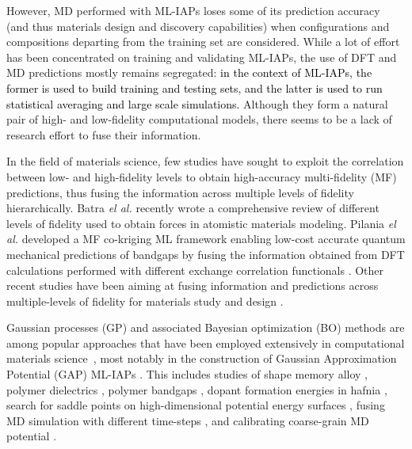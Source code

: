 \documentclass[%
 reprint,
aip,jcp
]{revtex4-1}
\newcommand{\review}[1]{\textcolor{black}{#1}}
\begin{document}

However, MD performed with ML-IAPs loses some of its prediction 
accuracy (and thus  materials design and discovery capabilities) 
when configurations and compositions departing from the training set 
are considered.
While a lot of effort has been concentrated on training and 
validating ML-IAPs, 
the use of DFT and MD predictions mostly remains segregated:
\review{in the context of ML-IAPs, the former is used to build training 
and testing sets, and the latter is used to run statistical averaging 
and large scale simulations.}
Although they form a natural pair of high- and low-fidelity  
computational models, there seems to be a lack of research effort to 
fuse their information.


In the field of materials science, few studies have sought to
exploit the correlation between low- and
high-fidelity levels to obtain high-accuracy multi-fidelity (MF) 
predictions, thus fusing the information across multiple 
levels of fidelity hierarchically.
Batra \emph{el al.} recently wrote a comprehensive review
of different levels of fidelity used to obtain forces in atomistic 
materials modeling\cite{batra2020machine}.
Pilania \emph{el al.} developed a MF co-kriging ML framework 
enabling low-cost accurate quantum mechanical predictions of bandgaps 
by fusing the information obtained from DFT calculations performed
with different exchange correlation functionals \cite{pilania2017multi}. 
Other recent studies have been aiming at fusing information and
predictions across multiple-levels of fidelity for materials
study and design 
\cite{acar2018crystal,sun2010two,razi2018fast,chen2020multi}.

Gaussian processes (GP) and associated Bayesian optimization (BO) 
methods are among popular approaches that have been employed extensively
in computational materials science~\cite{ramprasad2017machine},
most notably in the construction of Gaussian Approximation Potential 
(GAP) ML-IAPs \cite{bartok2010gaussian}.
This includes studies of shape memory alloy \cite{xue2016accelerated},
polymer dielectrics \cite{mannodi2016machine}, polymer
bandgaps \cite{patra2020multi}, dopant formation energies in hafnia
\cite{batra2020machine}, search for saddle points on high-dimensional 
potential energy surfaces
\cite{tran2018gpdft,tran2018efficient,koistinen2019minimum},
fusing MD simulation with different time-steps \cite{razi2018fast}, and 
calibrating coarse-grain MD potential \cite{razi2020force}.
\end{document}
